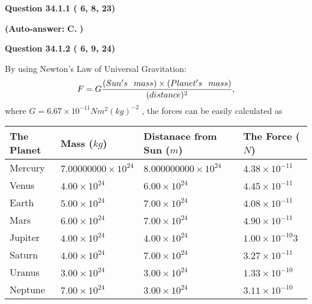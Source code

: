 \documentclass[12pt]{article}
\begin{document}
   
  
  
{\textbf{\large{Question
34.1.1 
 (          6,          8,         23)
}}}
 
 
{\textbf{(Auto-answer:}}
{\textbf{\large{
C.}}}
{\textbf{)}}
 
 
  
  
{\textbf{\large{Question
34.1.2 
 (          6,          9,         24)
}}}

By using Newton's Law of Universal Gravitation:
\[
F=G \frac{(Sun's \hspace{0.1in} mass) \times (Planet's \hspace{0.1in} mass)} { (distance)^2},
\]
where
$ G= %
6.67 \times 10^{-11} N m^{2}(kg)^{-2}$ , the forces can be easily calculated as
 
\vspace{0.2in}
 
 
\begin{tabular}{|l|l|l|l|}
\hline
The Planet & Mass ($kg$) & Distanace from Sun ($m$) & The Force ($N$)\\
\hline
Mercury  &
           $ %
7.00000000 \times 10^{24}  $   &
             $ %
8.000000000 \times 10^{24}$    & $ %
4.38 \times 10^{-11} $
\\  \hline
Venus    &
           $  %
4.00 \times 10^{24}  $     &
             $ %
6.00 \times 10^{24} $    & $ %
4.45 \times 10^{-11} $
\\  \hline
Earth    &
           $  %
5.00 \times 10^{24}$     &
             $ %
7.00 \times 10^{24} $    & $ %
4.08 \times 10^{-11} $
\\   \hline
Mars     &
           $  %
6.00 \times 10^{24} $     &
             $ %
7.00 \times 10^{24}$    & $ %
4.90 \times 10^{-11} $
\\   \hline
Jupiter  &
           $  %
4.00 \times 10^{24}  $    &
             $ %
4.00 \times 10^{24} $    & $ %
1.00 \times 10^{-10}3 $
\\  \hline
Saturn   &
           $  %
4.00 \times 10^{24}   $    &
             $ %
7.00 \times 10^{24}  $    & $ %
3.27 \times 10^{-11} $
\\  \hline
Uranus   &
           $  %
3.00 \times 10^{24} $    &
             $ %
3.00 \times 10^{24}$    & $ %
1.33 \times 10^{-10} $
\\  \hline
Neptune  &
           $  %
7.00 \times 10^{24}  $    &
             $ %
3.00 \times 10^{24} $    & $ %
3.11 \times 10^{-10} $
\\  \hline
 
\end{tabular}
 
\end{document}
